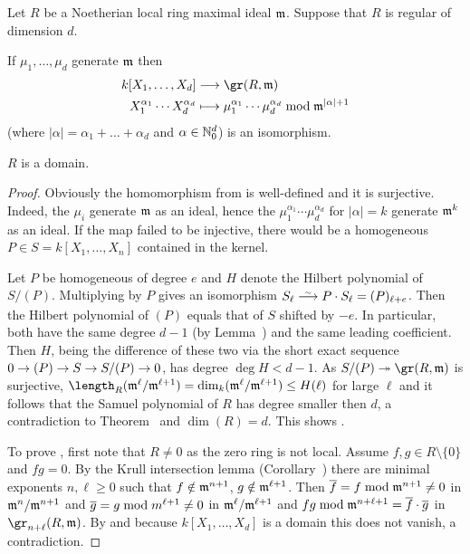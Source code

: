 \documentclass[a4paper,parskip=half,numbers=enddot, DIV=12, headheight=30pt]{scrreprt}
\begin{document}
\begin{cor}
    Let $R$ be a Noetherian local ring maximal ideal $\mathfrak{m}$. Suppose that $R$ is regular of dimension $d$.
    \begin{alphanumerate}
    \item 
        If $\mu_1,\ldots, \mu_d$ generate $\mathfrak{m}$ then 
        \begin{align*} 
            k[X_1,\ldots, X_d] &\morphism \gr(R,\mm)\\
            X_1^{\alpha_1}\cdots X_d^{\alpha_d} &\longmapsto \mu_1^{\alpha_1}\cdots\mu_d^{\alpha_d} \bmod \mm^{|\alpha| +1}
        \end{align*}
        (where $|\alpha|=\alpha_1+\ldots+\alpha_d$ and $\alpha\in\mathbb{N}_0^d$) is an isomorphism.
    \item 
        $R$ is a domain.
    \end{alphanumerate}
\end{cor}
\begin{proof}
    Obviously the homomorphism from  is well-defined and it is surjective. Indeed, the $\mu_i$ generate $\mathfrak{m}$ as an ideal, hence the $\mu_1^{\alpha_1}\cdots\mu_d^{\alpha_d}$ for $|\alpha|=k$ generate $\mathfrak{m}^k$ as an ideal. If the map failed to be injective, there would be a homogeneous $P\in S=k[X_1,\ldots, X_n]$ contained in the kernel. 
    
    Let $P$ be homogeneous of degree $e$ and $H$ denote the Hilbert polynomial of $S/(P)$. Multiplying by $P$ gives an isomorphism $S_\ell\isomorphism P\cdot S_\ell=(P)_{\ell+e}$. Then the Hilbert polynomial of $(P)$ equals that of $S$ shifted by $-e$. In particular, both have the same degree $d-1$ (by Lemma~) and the same leading coefficient. Then $H$, being the difference of these two via the short exact sequence $0\morphism (P)\morphism S\morphism S/(P)\morphism 0$, has degree $\deg H < d-1$. As $S/(P)\epimorphism \gr (R,\mm)$ is surjective, $\length_R(\mm^\ell /\mm^{\ell+1}) = \dim_k(\mm^\ell/\mm^{\ell+1}) \leq H(\ell)$ for large $\ell$ and it follows that the Samuel polynomial of $R$ has degree smaller then $d$, a contradiction to Theorem~ and $\dim(R) = d$. This shows .
    
    To prove , first note that $R\neq 0$ as the zero ring is not local. Assume $f,g\in R\setminus\{0\}$ and $fg = 0$. By the Krull intersection lemma (Corollary~) there are minimal exponents $n,\ell \geq 0$ such that $f\notin \mathfrak{m}^{n+1}$, $g\notin \mathfrak{m}^{\ell+1}$. Then $\overline f = f\bmod \mathfrak{m}^{n+1} \neq 0 $ in $\mathfrak{m}^n/\mathfrak{m}^{n+1}$ and $\overline g= g\bmod m^{\ell+1}\neq 0$ in $\mathfrak{m}^\ell/\mathfrak{m}^{\ell+1}$ and $fg\bmod \mathfrak{m}^{n+\ell+1} = \overline f\cdot \overline g$ in $\gr_{n+\ell}(R,\mm)$. By  and because $k[X_1,\ldots, X_d]$ is a domain this does not vanish, a contradiction.
\end{proof} 
\end{document}
